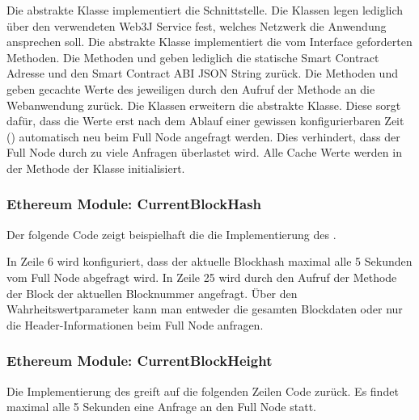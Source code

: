 Die abstrakte Klasse  implementiert die  Schnittstelle. Die Klassen  legen lediglich über den verwendeten Web3J Service fest, welches Netzwerk die Anwendung ansprechen soll.
Die abstrakte Klasse  implementiert die vom  Interface geforderten Methoden. Die Methoden  und  geben lediglich die statische Smart Contract Adresse und den Smart Contract ABI JSON String zurück. Die Methoden  und  geben gecachte Werte des jeweiligen  durch den Aufruf der  Methode an die Webanwendung zurück. Die Klassen  erweitern die abstrakte  Klasse. Diese sorgt dafür, dass die Werte erst nach dem Ablauf einer gewissen konfigurierbaren Zeit () automatisch neu beim Full Node angefragt werden. Dies verhindert, dass der Full Node durch zu viele Anfragen überlastet wird. Alle Cache Werte werden in der  Methode der  Klasse initialisiert. 


\subsubsection{Ethereum Module: CurrentBlockHash}

Der folgende Code zeigt beispielhaft die die Implementierung des .



In Zeile 6 wird konfiguriert, dass der aktuelle Blockhash maximal alle 5 Sekunden vom Full Node abgefragt wird. In Zeile 25 wird durch den Aufruf der  Methode der Block der aktuellen Blocknummer angefragt. Über den Wahrheitswertparameter kann man entweder die gesamten Blockdaten oder nur die Header-Informationen beim Full Node anfragen.

\subsubsection{Ethereum Module: CurrentBlockHeight}
Die Implementierung des  greift auf die folgenden Zeilen Code zurück. Es findet maximal alle 5 Sekunden eine Anfrage an den Full Node statt.

